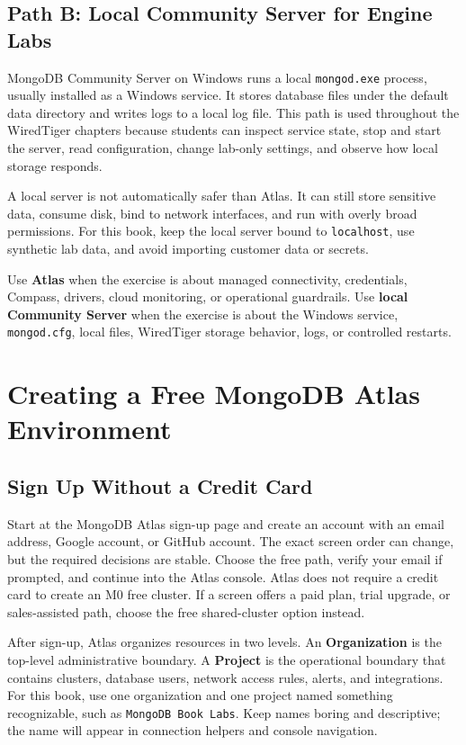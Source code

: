 \subsection{Path B: Local Community Server for Engine Labs}
MongoDB Community Server on Windows runs a local \texttt{mongod.exe} process, usually installed as a Windows service. It stores database files under the default data directory and writes logs to a local log file. This path is used throughout the WiredTiger chapters because students can inspect service state, stop and start the server, read configuration, change lab-only settings, and observe how local storage responds.

A local server is not automatically safer than Atlas. It can still store sensitive data, consume disk, bind to network interfaces, and run with overly broad permissions. For this book, keep the local server bound to \texttt{localhost}, use synthetic lab data, and avoid importing customer data or secrets.

\begin{definitionbox}
Use \textbf{Atlas} when the exercise is about managed connectivity, credentials, Compass, drivers, cloud monitoring, or operational guardrails. Use \textbf{local Community Server} when the exercise is about the Windows service, \texttt{mongod.cfg}, local files, WiredTiger storage behavior, logs, or controlled restarts.
\end{definitionbox}

\section{Creating a Free MongoDB Atlas Environment}
\subsection{Sign Up Without a Credit Card}
Start at the MongoDB Atlas sign-up page and create an account with an email address, Google account, or GitHub account. The exact screen order can change, but the required decisions are stable. Choose the free path, verify your email if prompted, and continue into the Atlas console. Atlas does not require a credit card to create an M0 free cluster. If a screen offers a paid plan, trial upgrade, or sales-assisted path, choose the free shared-cluster option instead.

After sign-up, Atlas organizes resources in two levels. An \textbf{Organization} is the top-level administrative boundary. A \textbf{Project} is the operational boundary that contains clusters, database users, network access rules, alerts, and integrations. For this book, use one organization and one project named something recognizable, such as \texttt{MongoDB Book Labs}. Keep names boring and descriptive; the name will appear in connection helpers and console navigation.

